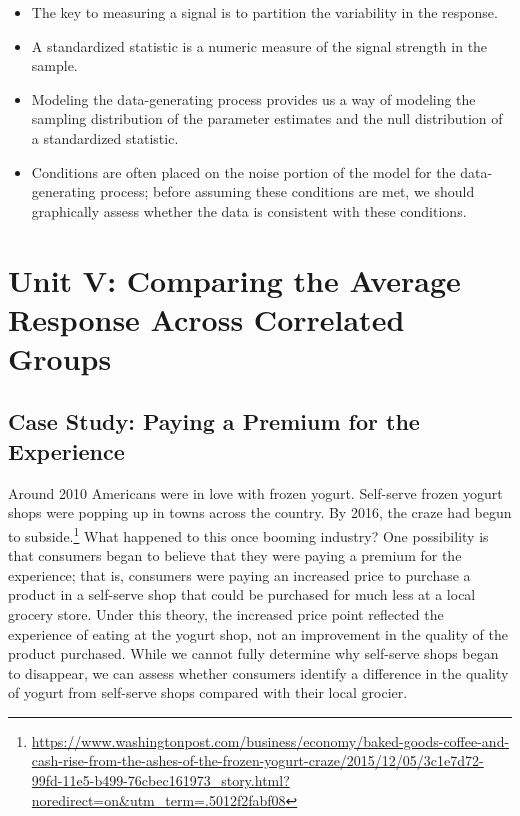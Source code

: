 \documentclass[]{book}
\providecommand{\tightlist}{%
  \setlength{\itemsep}{0pt}\setlength{\parskip}{0pt}}
\let\rmarkdownfootnote\footnote%
\def\footnote{\protect\rmarkdownfootnote}
\theoremstyle{plain}
\theoremstyle{mydefn}
\theoremstyle{myexmpl}
\theoremstyle{remark}
\begin{document}
\begin{itemize}
\tightlist
\item
  The key to measuring a signal is to partition the variability in the
  response.
\item
  A standardized statistic is a numeric measure of the signal strength
  in the sample.
\item
  Modeling the data-generating process provides us a way of modeling the
  sampling distribution of the parameter estimates and the null
  distribution of a standardized statistic.
\item
  Conditions are often placed on the noise portion of the model for the
  data-generating process; before assuming these conditions are met, we
  should graphically assess whether the data is consistent with these
  conditions.
\end{itemize}

\part{Unit V: Comparing the Average Response Across
Correlated
Groups}\label{part-unit-v-comparing-the-average-response-across-correlated-groups}

\hypertarget{CaseYogurt}{\chapter{Case Study: Paying a Premium for the
Experience}\label{CaseYogurt}}

Around 2010 Americans were in love with frozen yogurt. Self-serve frozen
yogurt shops were popping up in towns across the country. By 2016, the
craze had begun to subside.\footnote{\url{https://www.washingtonpost.com/business/economy/baked-goods-coffee-and-cash-rise-from-the-ashes-of-the-frozen-yogurt-craze/2015/12/05/3c1e7d72-99fd-11e5-b499-76cbec161973_story.html?noredirect=on\&utm_term=.5012f2fabf08}}
What happened to this once booming industry? One possibility is that
consumers began to believe that they were paying a premium for the
experience; that is, consumers were paying an increased price to
purchase a product in a self-serve shop that could be purchased for much
less at a local grocery store. Under this theory, the increased price
point reflected the experience of eating at the yogurt shop, not an
improvement in the quality of the product purchased. While we cannot
fully determine why self-serve shops began to disappear, we can assess
whether consumers identify a difference in the quality of yogurt from
self-serve shops compared with their local grocier.
\end{document}
